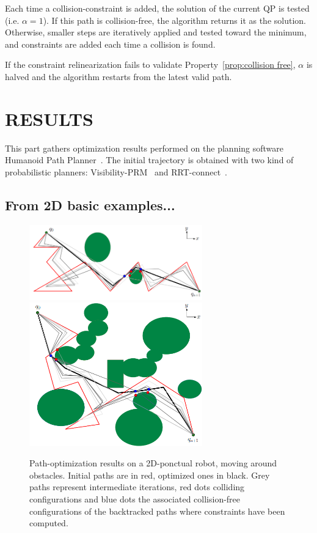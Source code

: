 \documentclass{tADR2e}
\begin{document}
Each time a collision-constraint is added, 
the solution of the current QP is tested (i.e. $\alpha = 1$). If this path is collision-free, the algorithm returns it as the solution. Otherwise, 
smaller steps are iteratively applied and tested toward the minimum, and constraints are added each time a collision is found.

If the constraint relinearization fails to validate Property~\ref{prop:collision free}, $\alpha$ is halved and the algorithm restarts from the latest valid path.


\section{RESULTS}

This part gathers optimization results performed on the planning software 
Humanoid Path Planner~\cite{hpp}. The initial trajectory is obtained with two 
kind of probabilistic planners: Visibility-PRM~\cite{visibility-prm} and 
RRT-connect~\cite{rrt-connect}.

\subsection{From 2D basic examples...}

\begin{figure}[t]
	\centering
	\includegraphics[width=7.5cm]{2d_final_green.png}
	\includegraphics[width=7.5cm]{concave_final_green.png}
	\caption{Path-optimization results on a 2D-ponctual robot, moving around 
	obstacles. Initial paths are in red, optimized ones in black. Grey paths 
	represent intermediate iterations, red dots colliding configurations and blue 
	dots the associated collision-free configurations of the backtracked paths 
	where constraints have been computed.}
	\label{2D_long}
\end{figure}
\end{document}
